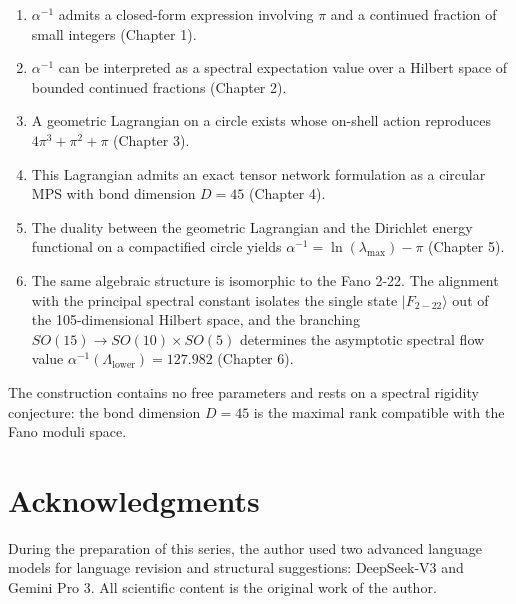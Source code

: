 \documentclass[12pt]{article}
\numberwithin{equation}{section}
\begin{document}
\begin{enumerate}
    \item \(\alpha^{-1}\) admits a closed-form expression involving \(\pi\) and a continued fraction of small integers (Chapter 1).
    \item \(\alpha^{-1}\) can be interpreted as a spectral expectation value over a Hilbert space of bounded continued fractions (Chapter 2).
    \item A geometric Lagrangian on a circle exists whose on-shell action reproduces \(4\pi^3 + \pi^2 + \pi\) (Chapter 3).
    \item This Lagrangian admits an exact tensor network formulation as a circular MPS with bond dimension \(D = 45\) (Chapter 4).
    \item The duality between the geometric Lagrangian and the Dirichlet energy functional on a compactified circle yields \(\alpha^{-1} = \ln(\lambda_{\max}) - \pi\) (Chapter 5).
    \item The same algebraic structure is isomorphic to the Fano 2-22. The alignment with the principal spectral constant isolates the single state \(|F_{2-22}\rangle\) out of the 105-dimensional Hilbert space, and the branching \(SO(15) \to SO(10) \times SO(5)\) determines the asymptotic spectral flow value \(\alpha^{-1}(\Lambda_{\text{lower}}) = 127.982\) (Chapter 6).
\end{enumerate}

The construction contains no free parameters and rests on a spectral rigidity conjecture: the bond dimension \(D = 45\) is the maximal rank compatible with the Fano moduli space.

\newpage

\section*{Acknowledgments}

During the preparation of this series, the author used two advanced language models for language revision and structural suggestions: DeepSeek-V3 and Gemini Pro 3. All scientific content is the original work of the author.

\newpage
\end{document}
